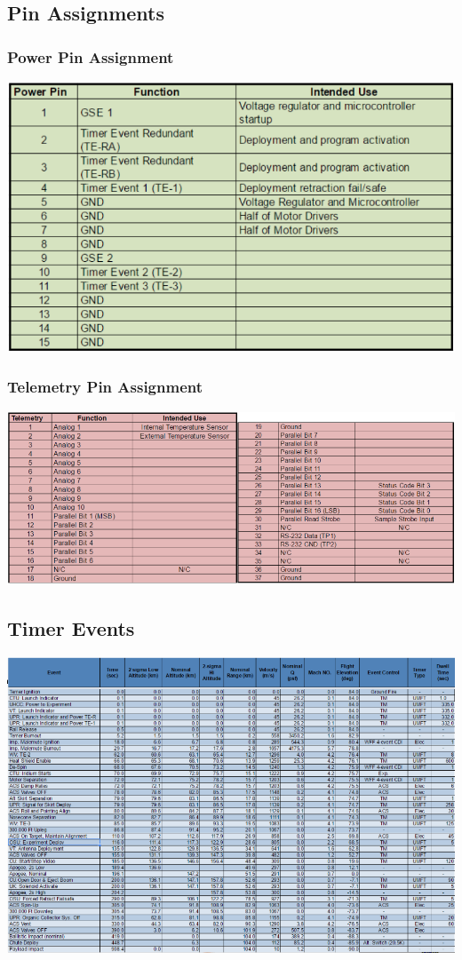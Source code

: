 \subsection{Pin Assignments}
\subsubsection{Power Pin Assignment}
\includegraphics[width=\textwidth]{./images/OtherDocs/powerPinAssignments}
\subsubsection{Telemetry Pin Assignment}
\includegraphics[width=\textwidth]{./images/OtherDocs/telemetryPinAssignments}

\subsection{Timer Events}
\includegraphics[width=\textwidth]{./images/OtherDocs/timerEvents}

